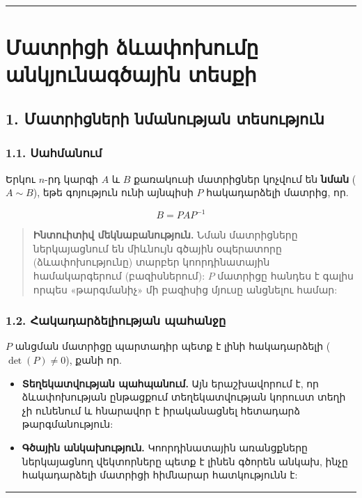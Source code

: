 \documentclass[12pt, a4paper]{article}
\begin{document}
\tableofcontents
\vspace{2em}
\hrule
\vspace{2em}

\section{Մատրիցի ձևափոխումը անկյունագծային տեսքի}

\subsection{1. Մատրիցների նմանության տեսություն}

\subsubsection{1.1. Սահմանում}

Երկու $n$-րդ կարգի $A$ և $B$ քառակուսի մատրիցներ կոչվում են \textbf{նման} ($A \sim B$), եթե գոյություն ունի այնպիսի $P$ հակադարձելի մատրից, որ.

$$
B = P A P^{-1}
$$

\begin{quote}
\textbf{Ինտուիտիվ մեկնաբանություն.} Նման մատրիցները ներկայացնում են միևնույն գծային օպերատորը (ձևափոխությունը) տարբեր կոորդինատային համակարգերում (բազիսներում): $P$ մատրիցը հանդես է գալիս որպես «թարգմանիչ» մի բազիսից մյուսը անցնելու համար:
\end{quote}

\subsubsection{1.2. Հակադարձելիության պահանջը}

$P$ անցման մատրիցը պարտադիր պետք է լինի հակադարձելի ($\det(P) \neq 0$), քանի որ.

\begin{itemize}
    \item \textbf{Տեղեկատվության պահպանում.} Այն երաշխավորում է, որ ձևափոխության ընթացքում տեղեկատվության կորուստ տեղի չի ունենում և հնարավոր է իրականացնել հետադարձ թարգմանություն:
    \item \textbf{Գծային անկախություն.} Կոորդինատային առանցքները ներկայացնող վեկտորները պետք է լինեն գծորեն անկախ, ինչը հակադարձելի մատրիցի հիմնարար հատկությունն է:
\end{itemize}

\vspace{1em}
\hrule
\vspace{1em}
\end{document}
